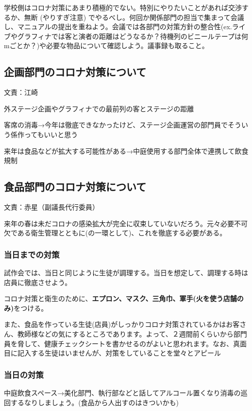 \documentclass[dvipdfmx,jb5]{jreport}
\begin{document}
学校側はコロナ対策にあまり積極的でない。特別にやりたいことがあれば交渉するか、無断 (やりすぎ注意) でやるべし。何回か関係部門の担当で集まって会議し、マニュアルの提出を重ねよう。会議では各部門の対策方針の整合性(ex.ライブやグラフィナでは客と演者の距離はどうなるか？待機列のビニールテープは何mごとか？)や必要な物品について確認しよう。議事録も取ること。

\subsection{企画部門のコロナ対策について} 文責：江崎 \vspace{2mm}

外ステージ企画やグラフィナでの最前列の客とステージの距離

客席の消毒→今年は徹底できなかったけど、ステージ企画運営の部門員でそういう係作ってもいいと思う

来年は食品などが拡大する可能性がある→中庭使用する部門全体で連携して飲食規制

\subsection{食品部門のコロナ対策について} 文責：赤星（副議長代行委員） \vspace{2mm}

来年の春は未だコロナの感染拡大が完全に収束していないだろう。元々必要不可欠である衛生管理とともに(の一環として)、これを徹底する必要がある。

\subsubsection{当日までの対策}
試作会では、当日と同じように生徒が調理する。当日を想定して、調理する時は店員に徹底させよう。

コロナ対策と衛生のために、{\bf エプロン、マスク、三角巾、軍手(火を使う店舗のみ)}をつける。

また、食品を作っている生徒(店員)がしっかりコロナ対策されているかはお客さん、教師様などの気にするところであります。よって、２週間前くらいから部門員を脅して、健康チェックシートを書かせるのがよいと思われます。なお、真面目に記入する生徒はいませんが、対策をしていることを堂々とアピール


\subsubsection{当日の対策}
中庭飲食スペース→美化部門、執行部などと話してアルコール置くなり消毒の巡回するなりしましょう。(食品から人出すのはきついかも)
\end{document}
